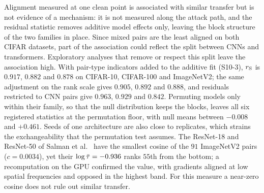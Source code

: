 Alignment measured at one clean point is associated with similar transfer but is not evidence of a mechanism: it is not measured along the attack path, and the residual statistic removes additive model effects only, leaving the block structure of the two families in place. Since mixed pairs are the least aligned on both CIFAR datasets, part of the association could reflect the split between CNNs and transformers. Exploratory analyses that remove or respect this split leave the association high. With pair-type indicators added to the additive fit (S10-3), $r_{\mathrm{S}}$ is $0.917$, $0.882$ and $0.878$ on CIFAR-10, CIFAR-100 and ImageNetV2; the same adjustment on the rank scale gives $0.905$, $0.892$ and $0.888$, and residuals restricted to CNN pairs give $0.963$, $0.929$ and $0.842$. Permuting models only within their family, so that the null distribution keeps the blocks, leaves all six registered statistics at the permutation floor, with null means between $-0.008$ and $+0.461$. Seeds of one architecture are also close to replicates, which strains the exchangeability that the permutation test assumes. The ResNet-18 and ResNet-50 of Salman et al.~\cite{salman2020adversarially} have the smallest cosine of the $91$ ImageNetV2 pairs ($c = 0.0034$), yet their $\log\bar{\tau} = -0.936$ ranks $55$th from the bottom; a recomputation on the GPU confirmed the value, with gradients aligned at low spatial frequencies and opposed in the highest band. For this measure a near-zero cosine does not rule out similar transfer.

